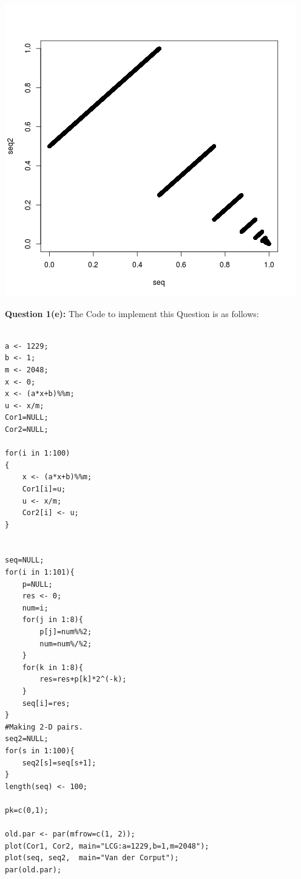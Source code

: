 \documentclass{article}
\begin{document}
\begin{center}
	\includegraphics{Question1_4.png}
\end{center}

\newpage
\textbf{\large Question 1(e):}
The Code to implement this Question is as follows:\\


\lstset {language=R}


\begin{lstlisting}

a <- 1229;
b <- 1;
m <- 2048;
x <- 0;
x <- (a*x+b)%%m;
u <- x/m;
Cor1=NULL;
Cor2=NULL;

for(i in 1:100)
{
	x <- (a*x+b)%%m;
	Cor1[i]=u;
	u <- x/m;
	Cor2[i] <- u;
}


seq=NULL;
for(i in 1:101){
	p=NULL;
	res <- 0;
	num=i;
	for(j in 1:8){
		p[j]=num%%2;
		num=num%/%2;
	}
	for(k in 1:8){
		res=res+p[k]*2^(-k);
	}
	seq[i]=res;
}
#Making 2-D pairs.
seq2=NULL;
for(s in 1:100){
	seq2[s]=seq[s+1];
}
length(seq) <- 100;

pk=c(0,1);

old.par <- par(mfrow=c(1, 2));
plot(Cor1, Cor2, main="LCG:a=1229,b=1,m=2048");
plot(seq, seq2,  main="Van der Corput");
par(old.par);


\end{lstlisting}
\end{document}
